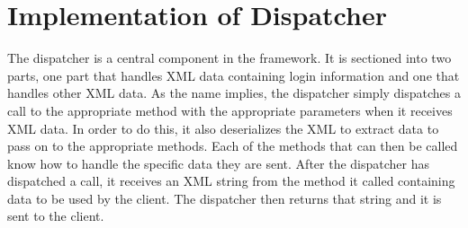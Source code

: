 \chapter{Implementation of Dispatcher}
\label{chap:dispImplementation}
The dispatcher is a central component in the framework. It is sectioned into two parts, one part that handles XML data containing login information and one that handles other XML data. As the name implies, the dispatcher simply dispatches a call to the appropriate method with the appropriate parameters when it receives XML data. In order to do this, it also deserializes the XML to extract data to pass on to the appropriate methods. Each of the methods that can then be called know how to handle the specific data they are sent. After the dispatcher has dispatched a call, it receives an XML string from the method it called containing data to be used by the client. The dispatcher then returns that string and it is sent to the client.